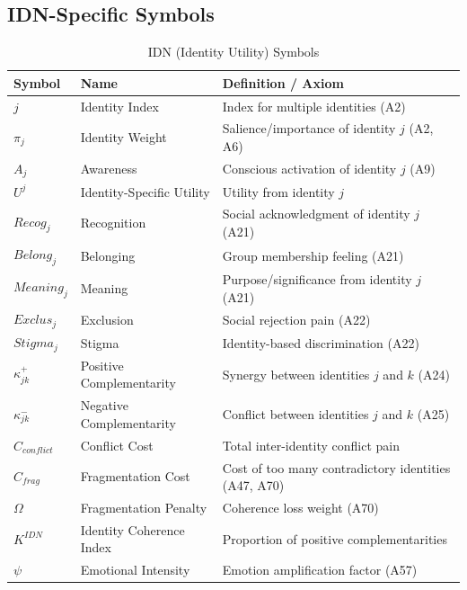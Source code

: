 \subsection{IDN-Specific Symbols}

\begin{longtable}{@{}lp{4cm}p{7cm}@{}}
\caption{IDN (Identity Utility) Symbols} \\
\toprule
\textbf{Symbol} & \textbf{Name} & \textbf{Definition / Axiom} \\
\midrule
\endfirsthead
\midrule
\endhead
\bottomrule
\endlastfoot

$j$ & Identity Index & Index for multiple identities (A2) \\
$\pi_j$ & Identity Weight & Salience/importance of identity $j$ (A2, A6) \\
$A_j$ & Awareness & Conscious activation of identity $j$ (A9) \\
$U^j$ & Identity-Specific Utility & Utility from identity $j$ \\
\addlinespace
$Recog_j$ & Recognition & Social acknowledgment of identity $j$ (A21) \\
$Belong_j$ & Belonging & Group membership feeling (A21) \\
$Meaning_j$ & Meaning & Purpose/significance from identity $j$ (A21) \\
$Exclus_j$ & Exclusion & Social rejection pain (A22) \\
$Stigma_j$ & Stigma & Identity-based discrimination (A22) \\
\addlinespace
$\kappa^+_{jk}$ & Positive Complementarity & Synergy between identities $j$ and $k$ (A24) \\
$\kappa^-_{jk}$ & Negative Complementarity & Conflict between identities $j$ and $k$ (A25) \\
$C_{conflict}$ & Conflict Cost & Total inter-identity conflict pain \\
$C_{frag}$ & Fragmentation Cost & Cost of too many contradictory identities (A47, A70) \\
\addlinespace
$\Omega$ & Fragmentation Penalty & Coherence loss weight (A70) \\
$K^{IDN}$ & Identity Coherence Index & Proportion of positive complementarities \\
$\psi$ & Emotional Intensity & Emotion amplification factor (A57) \\

\end{longtable}

